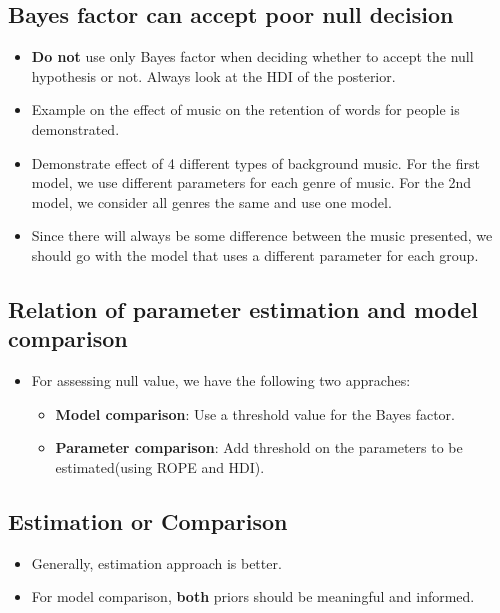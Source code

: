 \documentclass[a4paper]{article}
\begin{document}
\subsection{Bayes factor can accept poor null decision}
\begin{itemize}
    \item \textbf{Do not} use only Bayes factor when deciding whether to accept the null hypothesis or not. Always look at the HDI of the posterior. 
    \item Example on the effect of music on the retention of words for people is demonstrated.
    \item Demonstrate effect of 4 different types of background music. For the first model, we use different parameters for each genre of music. For the 2nd model, we consider all genres the same and use one model.
    \item Since there will always be some difference between the music presented, we should go with the model that uses a different parameter for each group.
\end{itemize}
\subsection{Relation of parameter estimation and model comparison}
\begin{itemize}
    \item For assessing null value, we have the following two appraches:
        \begin{itemize}
            \item \textbf{Model comparison}: Use a threshold value for the Bayes factor. 
            \item \textbf{Parameter comparison}: Add threshold on the parameters to be estimated(using ROPE and HDI). 
        \end{itemize}
\end{itemize}
\subsection{Estimation or Comparison}
\begin{itemize}
    \item Generally, estimation approach is better.
    \item For model comparison, \textbf{both} priors should be meaningful and informed. 
\end{itemize}
\end{document}
